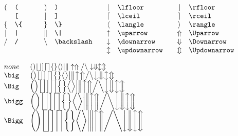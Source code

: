 \documentclass{article}
\begin{document}
    \begin{math}
        \begin{array}{cl@{\qquad\quad}cl@{\qquad}cl@{\qquad}cl}
            ( & \verb=(= & ) & \verb=)= & \lfloor & \verb=\lfloor= & \rfloor & \verb=\rfloor= \\
               & \verb=[= & ]  & \verb=]= & \lceil & \verb=\lceil= & \rceil & \verb=\rceil= \\
            \{ & \verb=\{= & \} & \verb=\}= & \langle & \verb=\langle= & \rangle & \verb=\rangle= \\
            | & \verb=|= & \| & \verb=\|= & \uparrow & \verb=\uparrow= & \Uparrow & \verb=\Uparrow= \\
            / & \verb=/= & \backslash & \verb=\backslash= & \downarrow & \verb=\downarrow= & \Downarrow & \verb=\Downarrow= \\
              &          &   &                    & \updownarrow & \verb=\updownarrow= & \Updownarrow & \verb=\Updownarrow= \\
        \end{array}
    \end{math}

    \begin{math}
        \begin{array}{l@{\quad}l}
            none & () \lfloor \rfloor ] \lceil \rceil \{ \} \langle \rangle | \| \uparrow \Uparrow / \backslash \downarrow \Downarrow \updownarrow \Updownarrow \\
            \verb=\big= & {\big( \big) \big\lfloor \big\rfloor \big] \big\lceil \big\rceil \big\{ \big\} \big\langle \big\rangle \big| \big\| \big\uparrow \big\Uparrow \big/ \big\backslash \big\downarrow \big\Downarrow \big\updownarrow \big\Updownarrow} \\
            \verb=\Big= & {\Big( \Big) \Big\lfloor \Big\rfloor \Big] \Big\lceil \Big\rceil \Big\{ \Big\} \Big\langle \Big\rangle \Big| \Big\| \Big\uparrow \Big\Uparrow \Big/ \Big\backslash \Big\downarrow \Big\Downarrow \Big\updownarrow \Big\Updownarrow} \\
            \verb=\bigg= & {\bigg( \bigg) \bigg\lfloor \bigg\rfloor \bigg] \bigg\lceil \bigg\rceil \bigg\{ \bigg\} \bigg\langle \bigg\rangle \bigg| \bigg\| \bigg\uparrow \bigg\Uparrow \bigg/ \bigg\backslash \bigg\downarrow \bigg\Downarrow \bigg\updownarrow \bigg\Updownarrow} \\
            \verb=\Bigg= & {\Bigg( \Bigg) \Bigg\lfloor \Bigg\rfloor \Bigg] \Bigg\lceil \Bigg\rceil \Bigg\{ \Bigg\} \Bigg\langle \Bigg\rangle \Bigg| \Bigg\| \Bigg\uparrow \Bigg\Uparrow \Bigg/ \Bigg\backslash \Bigg\downarrow \Bigg\Downarrow \Bigg\updownarrow \Bigg\Updownarrow} \\
        \end{array}
    \end{math}
\end{document}
